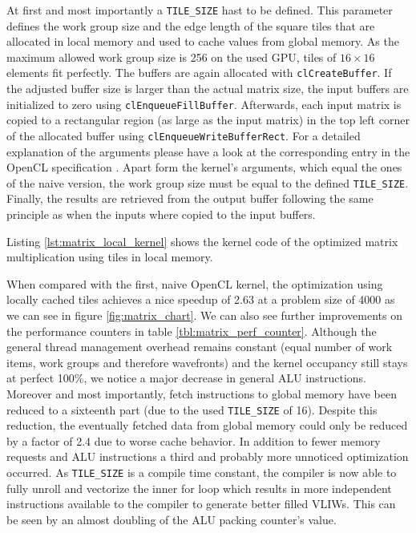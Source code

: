 At first and most importantly a \lstinline!TILE_SIZE! hast to be defined. This parameter defines the work group size and the edge length of the square tiles that are allocated in local memory and used to cache values from global memory. As the maximum allowed work group size is 256 on the used GPU, tiles of $16 \times 16$ elements fit perfectly.
The buffers are again allocated with \lstinline!clCreateBuffer!. If the adjusted buffer size is larger than the actual matrix size, the input buffers are initialized to zero using \lstinline!clEnqueueFillBuffer!. Afterwards, each input matrix is copied to a rectangular region (as large as the input matrix) in the top left corner of the allocated buffer using \lstinline!clEnqueueWriteBufferRect!. For a detailed explanation of the arguments please have a look at the corresponding entry in the OpenCL specification \cite[p.76]{opencl_spec}. Apart form the kernel's arguments, which equal the ones of the naive version, the work group size must be equal to the defined \lstinline!TILE_SIZE!. Finally, the results are retrieved from the output buffer following the same principle as when the inputs where copied to the input buffers.

Listing \ref{lst:matrix_local_kernel} shows the kernel code of the optimized matrix multiplication using tiles in local memory.



When compared with the first, naive OpenCL kernel, the optimization using locally cached tiles achieves a nice speedup of 2.63 at a problem size of 4000 as we can see in figure \ref{fig:matrix_chart}.
We can also see further improvements on the performance counters in table \ref{tbl:matrix_perf_counter}. Although the general thread management overhead remains constant (equal number of work items, work groups and therefore wavefronts) and the kernel occupancy still stays at perfect 100\%, we notice a major decrease in general ALU instructions. Moreover and most importantly, fetch instructions to global memory have been reduced to a sixteenth part (due to the used \lstinline!TILE_SIZE! of 16). Despite this reduction, the eventually fetched data from global memory could only be reduced by a factor of 2.4 due to worse cache behavior.
In addition to fewer memory requests and ALU instructions a third and probably more unnoticed optimization occurred. As \lstinline!TILE_SIZE! is a compile time constant, the compiler is now able to fully unroll and vectorize the inner for loop which results in more independent instructions available to the compiler to generate better filled VLIWs. This can be seen by an almost doubling of the ALU packing counter's value.


